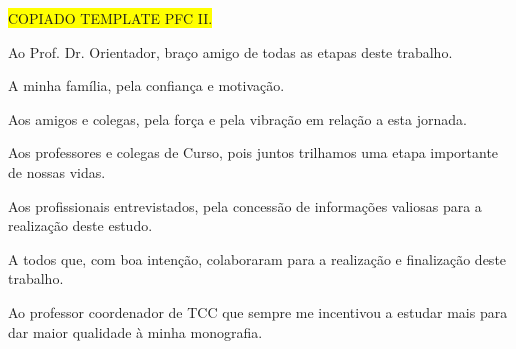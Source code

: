 
\begin{agradecimentos}

\colorbox{yellow}{COPIADO TEMPLATE PFC II.}

Ao Prof. Dr. Orientador, braço amigo de todas as etapas deste trabalho.

A minha família, pela confiança e motivação.

Aos amigos e colegas, pela força e pela vibração em relação a  esta jornada.

Aos professores e colegas de Curso, pois juntos trilhamos uma etapa importante de nossas vidas.

Aos profissionais entrevistados, pela concessão de informações valiosas para a realização deste estudo.

A todos que, com boa intenção, colaboraram para a realização e finalização deste trabalho.

Ao professor coordenador de TCC que sempre me incentivou a estudar mais para dar maior qualidade à minha monografia.


\end{agradecimentos}

